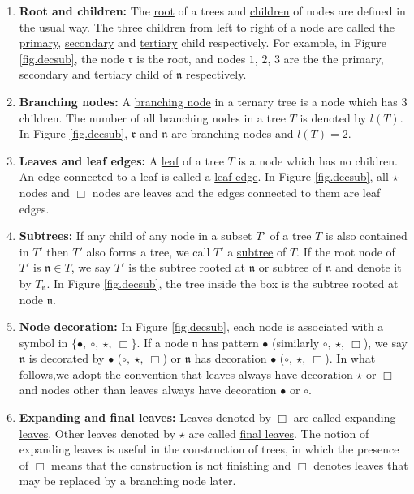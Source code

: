 \begin{defn}
\begin{enumerate}
    \item \textbf{Root and children:} The \underline{root} of a trees and \underline{children} of nodes are defined in the usual way. The three children from left to right of a node are called the \underline{primary}, \underline{secondary} and \underline{tertiary} child respectively. For example, in Figure \ref{fig.decsub}, the node $\mathfrak{r}$ is the root, and nodes $1$, $2$, $3$ are the the primary, secondary and tertiary child of $\mathfrak{n}$ respectively.
    \item \textbf{Branching nodes:} A \underline{branching node} in a ternary tree is a node which has $3$ children. The number of all branching nodes in a tree $T$ is denoted by $l(T)$. In Figure \ref{fig.decsub}, $\mathfrak{r}$ and $\mathfrak{n}$ are branching nodes and $l(T)=2$.
    \item \textbf{Leaves and leaf edges:} A \underline{leaf} of a tree $T$ is a node which has no children. An edge connected to a leaf is called a \underline{leaf edge}. In Figure \ref{fig.decsub}, all $\star$ nodes and $\Box$ nodes are leaves and the edges connected to them are leaf edges.
    \item \textbf{Subtrees:} If any child of any node in a subset $T'$ of a tree $T$ is also contained in $T'$ then $T' $ also forms a tree, we call $T'$ a \underline{subtree} of $T$. If the root node of $T'$ is $\mathfrak{n}\in T$, we say $T'$ is the \underline{subtree rooted at $\mathfrak{n}$} or \underline{subtree of $\mathfrak{n}$} and denote it by $T_\mathfrak{n}$. In Figure \ref{fig.decsub}, the tree inside the box is the subtree rooted at node $\mathfrak{n}$.
    \item \textbf{Node decoration:} In Figure \ref{fig.decsub}, each node is associated with a symbol in $\{\bullet,\ \circ,\ \star,\ \Box\}$. If a node $\mathfrak{n}$ has pattern $\bullet$ (similarly $ \circ,\ \star,\ \Box$), we say $\mathfrak{n}$ is decorated by $\bullet$ ($ \circ,\ \star,\ \Box$) or $\mathfrak{n}$ has decoration $\bullet$ ($ \circ,\ \star,\ \Box$). In what follows,we adopt the convention that leaves always have decoration $\star$ or $\Box$ and nodes other than leaves always have decoration $\bullet$ or $\circ$.
    
    \item \textbf{Expanding and final leaves:} Leaves denoted by $\Box$ are called \underline{expanding leaves}. Other leaves denoted by $\star$ are called \underline{final leaves}. The notion of expanding leaves is useful in the construction of trees, in which the presence of $\Box$ means that the construction is not finishing and $\Box$ denotes leaves that may be replaced by a branching node later.
    

\end{enumerate}
\end{defn}
